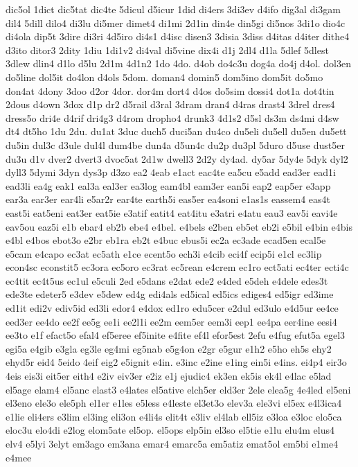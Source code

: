 {dic5ol
1dict
dic5tat
dic4te
5dicul
d5icur
1did
di4ers
3di3ev
d4ifo
dig3al
di3gam
dil4
5dill
dilo4
di3lu
di5mer
dimet4
di1mi
2d1in
din4e
din5gi
di5nos
3di1o
dio4c
di4ola
dip5t
3dire
di3ri
4d5iro
di4s1
d4isc
disen3
3disia
3diss
d4itas
d4iter
dithe4
d3ito
ditor3
2dity
1diu
1di1v2
di4val
di5vine
dix4i
d1j
2dl4
d1la
5dlef
5dlest
3dlew
dlin4
d1lo
d5lu
2d1m
4d1n2
1do
4do.
d4ob
do4c3u
dog4a
do4j
d4ol.
dol3en
do5line
dol5it
do4lon
d4ols
5dom.
doman4
domin5
dom5ino
dom5it
do5mo
don4at
4dony
3doo
d2or
4dor.
dor4m
dort4
d4os
do5sim
dossi4
dot1a
dot4tin
2dous
d4own
3dox
d1p
dr2
d5rail
d3ral
3dram
dran4
d4ras
drast4
3drel
dres4
dress5o
dri4e
d4rif
dri4g3
d4rom
dropho4
drunk3
4d1s2
d5sl
ds3m
ds4mi
d4sw
dt4
dt5ho
1du
2du.
du1at
3duc
duch5
duci5an
du4co
du5eli
du5ell
du5en
du5ett
du5in
dul3c
d3ule
dul4l
dum4be
dun4a
d5un4c
du2p
du3pl
5duro
d5use
dust5er
du3u
d1v
dver2
dvert3
dvoc5at
2d1w
dwell3
2d2y
dy4ad.
dy5ar
5dy4e
5dyk
dyl2
dyll3
5dymi
3dyn
dys3p
d3zo
ea2
4eab
e1act
eac4te
ea5cu
e5add
ead3er
ead1i
ead3li
ea4g
eak1
eal3a
eal3er
ea3log
eam4bl
eam3er
ean5i
eap2
eap5er
e3app
ear3a
ear3er
ear4li
e5ar2r
ear4te
earth5i
eas5er
ea4soni
e1as1s
eassem4
eas4t
east5i
eat5eni
eat3er
eat5ie
e3atif
eatit4
eat4itu
e3atri
e4atu
eau3
eav5i
eavi4e
eav5ou
eaz5i
e1b
ebar4
eb2b
ebe4
e4bel.
e4bels
e2ben
eb5et
eb2i
e5bil
e4bin
e4bis
e4bl
e4bos
ebot3o
e2br
eb1ra
eb2t
e4buc
ebus5i
ec2a
ec3ade
ecad5en
ecal5e
e5cam
e4capo
ec3at
ec5ath
e1ce
ecent5o
ech3i
e4cib
eci4f
ecip5i
e1cl
ec3lip
econ4sc
econstit5
ec3ora
ec5oro
ec3rat
ec5rean
e4crem
ec1ro
ect5ati
ec4ter
ecti4c
ec4tit
ec4t5us
ec1ul
e5culi
2ed
e5dans
e2dat
ede2
e4ded
e5deh
e4dele
edes3t
ede3te
edeter5
e3dev
e5dew
ed4g
edi4als
ed5ical
ed5ics
ediges4
ed5igr
ed3ime
ed1it
edi2v
ediv5id
ed3li
edor4
e4dox
ed1ro
edu5cer
e2dul
ed3ulo
e4d5ur
ee4ce
eed3er
ee4do
ee2f
ee5g
ee1i
ee2l1i
ee2m
eem5er
eem3i
eep1
ee4pa
eer4ine
eesi4
ee3to
e1f
efact5o
efal4
ef5eree
ef5inite
e4fite
ef4l
efor5est
2efu
e4fug
efut5a
egel3
egi5a
e4gib
e3gla
eg3le
eg4mi
eg5nab
e5g4on
e2gr
e5gur
e1h2
e5ho
eh5s
ehy2
ehyd5r
eid4
5eido
4eif
eig2
e5ignit
e4in.
e3inc
e2ine
e1ing
ein5i
e4ins.
ei4p4
eir3o
4eis
eis3i
eit5er
eith4
e2iv
eiv3er
e2iz
e1j
ejudic4
ek3en
ek5is
ek4l
e4lac
e5lad
el5age
elam4
el5anc
elast3
e4lates
el5ative
elch5er
eld3er
2ele
elea5g
4e4led
el5eni
el3eno
ele3o
ele5ph
el1er
e1les
e5less
e4leste
el3et3o
elev3a
ele3vi
el5ex
e4l3ica4
e1lie
eli4ers
e3lim
el3ing
eli3on
e4li4s
elit4t
e3liv
el4lab
ell5iz
e3loa
e3loc
elo5ca
eloc3u
elo4di
e2log
elom5ate
el5op.
el5ops
elp5in
el3so
el5tie
e1lu
elu4m
elus4
elv4
e5lyi
3elyt
em3ago
em3ana
emar4
emarc5a
em5atiz
emat5ol
em5bi
e1me4
e4mee
}
